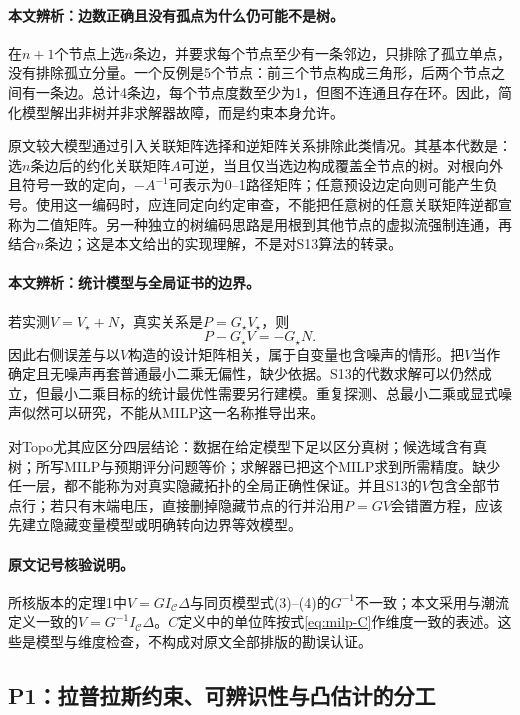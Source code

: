 \documentclass[UTF8,11pt,fontset=fandol]{ctexart}
\theoremstyle{remark}
\numberwithin{equation}{section}
\begin{document}
\paragraph{本文辨析：边数正确且没有孤点为什么仍可能不是树。}
在$n+1$个节点上选$n$条边，并要求每个节点至少有一条邻边，只排除了孤立单点，没有排除孤立分量。一个反例是5个节点：前三个节点构成三角形，后两个节点之间有一条边。总计4条边，每个节点度数至少为1，但图不连通且存在环。因此，简化模型解出非树并非求解器故障，而是约束本身允许。

原文较大模型通过引入关联矩阵选择和逆矩阵关系排除此类情况。其基本代数是：选$n$条边后的约化关联矩阵$A$可逆，当且仅当选边构成覆盖全节点的树。对根向外且符号一致的定向，$-A^{-1}$可表示为0--1路径矩阵；任意预设边定向则可能产生负号。使用这一编码时，应连同定向约定审查，不能把任意树的任意关联矩阵逆都宣称为二值矩阵。另一种独立的树编码思路是用根到其他节点的虚拟流强制连通，再结合$n$条边；这是本文给出的实现理解，不是对S13算法的转录。

\paragraph{本文辨析：统计模型与全局证书的边界。}
若实测$V=V_\star+N$，真实关系是$P=G_\star V_\star$，则
\begin{equation}
 P-G_\star V=-G_\star N.
 \label{eq:milp-eiv}
\end{equation}
因此右侧误差与以$V$构造的设计矩阵相关，属于自变量也含噪声的情形。把$V$当作确定且无噪声再套普通最小二乘无偏性，缺少依据。S13的代数求解可以仍然成立，但最小二乘目标的统计最优性需要另行建模。重复探测、总最小二乘或显式噪声似然可以研究，不能从MILP这一名称推导出来。

对Topo尤其应区分四层结论：数据在给定模型下足以区分真树；候选域含有真树；所写MILP与预期评分问题等价；求解器已把这个MILP求到所需精度。缺少任一层，都不能称为对真实隐藏拓扑的全局正确性保证。并且S13的$V$包含全部节点行；若只有末端电压，直接删掉隐藏节点的行并沿用$P=GV$会错置方程，应该先建立隐藏变量模型或明确转向边界等效模型。

\paragraph{原文记号核验说明。}
所核版本的定理1中$V=GI_{\mathcal C}\Delta$与同页模型式(3)--(4)的$G^{-1}$不一致；本文采用与潮流定义一致的$V=G^{-1}I_{\mathcal C}\Delta$。$C$定义中的单位阵按式\eqref{eq:milp-C}作维度一致的表述。这些是模型与维度检查，不构成对原文全部排版的勘误认证。

\subsection{P1：拉普拉斯约束、可辨识性与凸估计的分工}
\label{subsec:P1}
\end{document}
